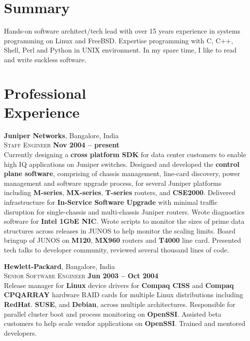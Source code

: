 \documentclass[margin,line]{resume}
\begin{document}
\begin{resume}

    \section{\mysidestyle Summary}

    Hands-on software architect/tech lead with over 15 years experience
    in systems programming on Linux and FreeBSD. Expertise programming
    with C, C++, Shell, Perl and Python in UNIX environment. In my spare
    time, I like to read and write suckless software.

    \section{\mysidestyle Professional\\Experience}

    \textbf{Juniper Networks}, Bangalore, India \\\vspace{1mm}%
    \textsc{Staff Engineer} \hfill \textbf{Nov 2004 -- present}\\
    Currently designing a {\bf cross platform SDK} for data center
    customers to enable high IQ applications on Juniper switches.
    Designed and developed the {\bf control plane software},
    comprising of chassis management, line-card discovery, power
    management and software upgrade process, for several Juniper
    platforms including {\bf M-series}, {\bf MX-series}, {\bf
    T-series} routers, and {\bf CSE2000}. Delivered infrastructure for
    {\bf In-Service Software Upgrade} with minimal traffic disruption
    for single-chassis and multi-chassis Juniper routers. Wrote
    diagnostics software for {\bf Intel 1GbE NIC}. Wrote scripts to
    monitor the sizes of prime data structures across releases in
    JUNOS to help monitor the scaling limits. Board bringup of JUNOS
    on {\bf M120}, {\bf MX960} routers and {\bf T4000} line card.
    Presented tech talks to developer community, reviewed several
    thousand lines of code.

    \textbf{Hewlett-Packard}, Bangalore, India \\\vspace{1mm}%
    \textsc{Senior Software Engineer} \hfill \textbf{Jun 2003 -- Oct 2004}\\
    Release manager for {\bf Linux} device drivers for {\bf Compaq
    CISS} and {\bf Compaq CPQARRAY} hardware RAID cards for multiple
    Linux distributions including {\bf RedHat}. {\bf SUSE}, and {\bf
    Debian}, across multiple architectures. Responsible for parallel
    cluster boot and process monitoring on {\bf OpenSSI}. Assisted
    beta customers to help scale vendor applications on {\bf OpenSSI}.
    Trained and mentored developers.


\end{resume}
\end{document}
